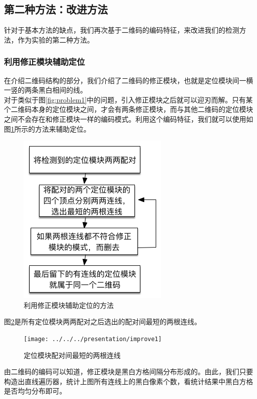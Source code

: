 \subsection{第二种方法：改进方法}
针对于基本方法的缺点，我们再次基于二维码的编码特征，来改进我们的检测方法，作为实验的第二种方法。
\subsubsection{利用修正模块辅助定位}
在介绍二维码结构的部分，我们介绍了二维码的修正模块，也就是定位模块间一横一竖的两条黑白相间的线。\\
对于类似于图\ref{fig:problem1}中的问题，引入修正模块之后就可以迎刃而解。只有某个二维码本身的定位模块之间，才会有两条修正模块，而与其他二维码的定位模块之间不会存在和修正模块一样的编码模式。利用这个编码特征，我们就可以使用如图\ref{fig:correct}所示的方法来辅助定位。
\begin{figure}[h]
\centering
\includegraphics[width=0.8\linewidth]{correct}
\caption[correct]{利用修正模块辅助定位的方法}
\label{fig:correct}
\end{figure}
图\ref{fig:improve1}是所有定位模块两两配对之后选出的配对间最短的两根连线。
\begin{figure}[h]
\centering
\texttt{[image: ../../../presentation/improve1]}
\caption[improve1]{定位模块配对间最短的两根连线}
\label{fig:improve1}
\end{figure}
由二维码的编码可以知道，修正模块是黑白方格间隔分布形成的。由此，我们只要构造出直线遍历器，统计上图所有连线上的黑白像素个数，看统计结果中黑白方格是否均匀分布即可。\\
